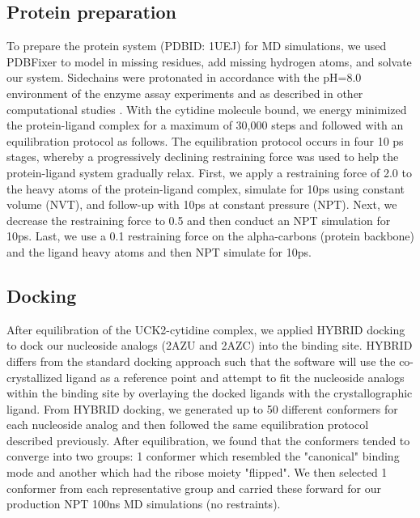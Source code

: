 \subsection{Protein preparation}
To prepare the protein system (PDBID: 1UEJ) for MD simulations, we used PDBFixer \cite{pdbfixer} to model in missing residues, add missing hydrogen atoms, and solvate our system.
Sidechains were protonated in accordance with the pH=8.0 environment of the enzyme assay experiments \cite{doi:10.1021/bi102054n} and as described in other computational studies \cite{tanaka2016molecular}.
With the cytidine molecule bound, we energy minimized the protein-ligand complex for a maximum of 30,000 steps and followed with an equilibration protocol as follows.
The equilibration protocol occurs in four 10 ps stages, whereby a progressively declining restraining force was used to help the protein-ligand system gradually relax.
First, we apply a restraining force of 2.0 to the heavy atoms of the protein-ligand complex, simulate for 10ps using constant volume (NVT), and follow-up with 10ps at constant pressure (NPT).
Next, we decrease the restraining force to 0.5 and then conduct an NPT simulation for 10ps.
Last, we use a 0.1 restraining force on the alpha-carbons (protein backbone) and the ligand heavy atoms and then NPT simulate for 10ps.

\subsection{Docking}
After equilibration of the UCK2-cytidine complex, we applied HYBRID docking \cite{mcgann2012fred} to dock our nucleoside analogs (2AZU and 2AZC) into the binding site.
HYBRID differs from the standard docking approach such that the software will use the co-crystallized ligand as a reference point and attempt to fit the nucleoside analogs within the binding site by overlaying the docked ligands with the crystallographic ligand.
From HYBRID docking, we generated up to 50 different conformers for each nucleoside analog and then followed the same equilibration protocol described previously.
After equilibration, we found that the conformers tended to converge into two groups: 1 conformer which resembled the "canonical" binding mode and another which had the ribose moiety "flipped".
We then selected 1 conformer from each representative group and carried these forward for our production NPT 100ns MD simulations (no restraints).

